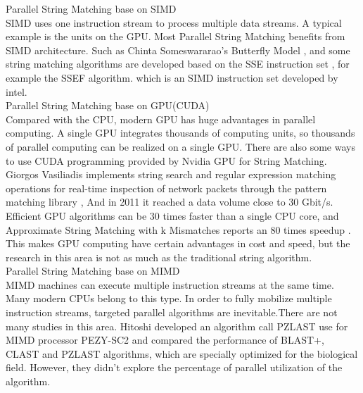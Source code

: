 \documentclass[11pt]{article}       %
\begin{document}
Parallel String Matching base on SIMD\\
SIMD uses one instruction stream to process multiple data streams. A typical example is the units on the GPU. Most Parallel String Matching benefits from SIMD architecture. Such as Chinta Someswararao's Butterfly Model \cite{Butterfly}, and some string matching algorithms are developed based on the SSE instruction set \cite{Matching}, for example the SSEF algorithm. which is an SIMD instruction set developed by intel. \\

Parallel String Matching base on GPU(CUDA)\\
Compared with the CPU, modern GPU has huge advantages in parallel computing. A single GPU integrates thousands of computing units, so thousands of parallel computing can be realized on a single GPU. There are also some ways to use CUDA programming provided by Nvidia GPU for String Matching. Giorgos Vasiliadis implements string search and regular expression matching operations for real-time inspection of network packets through the pattern matching library \cite{Bit-Parallel}, And in 2011 it reached a data volume close to 30 Gbit/s. Efficient GPU algorithms can be 30 times faster than a single CPU core, and Approximate String Matching with k Mismatches reports an 80 times speedup \cite{pattern-matching}. This makes GPU computing have certain advantages in cost and speed, but the research in this area is not as much as the traditional string algorithm. \\


Parallel String Matching base on MIMD\\
MIMD machines can execute multiple instruction streams at the same time. Many modern CPUs belong to this type. In order to fully mobilize multiple instruction streams, targeted parallel algorithms are inevitable.There are not many studies in this area. Hitoshi developed an algorithm call PZLAST use for MIMD processor PEZY-SC2 and compared the performance of BLAST+, CLAST and PZLAST algorithms\cite{MIMD}, which are specially optimized for the biological field. However, they didn't explore the percentage of parallel utilization of the algorithm.\\
\end{document}
